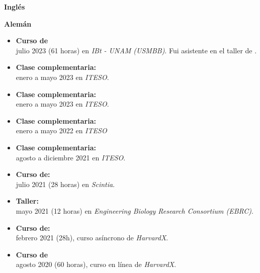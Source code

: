 \documentclass{simplecv}
\begin{document}
\newpage
\setlength\columnsep{0.33in}
\begin{multicols}{2}
\vspace{-8pt}
\textbf{Inglés}\\

\medskip

\textbf{Alemán}\\

\bigskip

\vspace{-8pt}
{\small
  \begin{itemize}[leftmargin=*]
  \setlength{\itemsep}{6pt}
    \item \textbf{Curso de }\\julio 2023 (61 horas) en \textit{IBt - UNAM (USMBB)}. Fui asistente en el taller de .
    \item \textbf{Clase complementaria: }\\enero a mayo 2023 en \textit{ITESO}.
    \item \textbf{Clase complementaria: }\\enero a mayo 2023 en \textit{ITESO}.
    \item \textbf{Clase complementaria:  }\\enero a mayo 2022 en \textit{ITESO}
    \item \textbf{Clase complementaria: }\\agosto a diciembre 2021 en \textit{ITESO}.
    \item \textbf{Curso de: }\\julio 2021 (28 horas) en \textit{Scintia}.
    \item \textbf{Taller: }\\mayo 2021 (12 horas) en \textit{Engineering Biology Research Consortium (EBRC)}.
    \item \textbf{Curso de: }\\febrero 2021 (28h), curso asíncrono de \textit{HarvardX}.
    \item \textbf{Curso de }\\agosto 2020 (60 horas), curso en línea de \textit{HarvardX}.
  \end{itemize}
}


\end{multicols}
\end{document}

